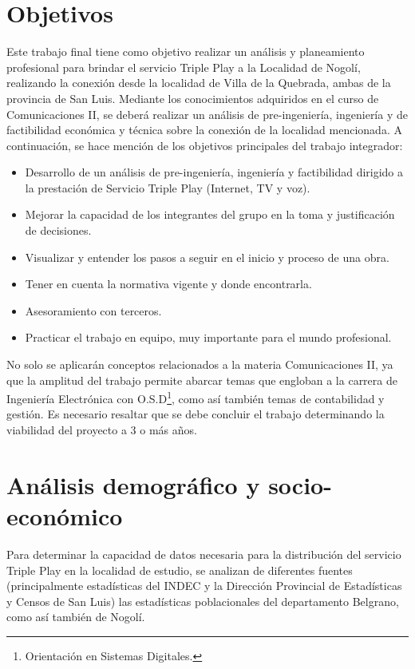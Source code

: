 \documentclass[12pt,a4paper]{book}
\begin{document}
\chapter{Objetivos}\label{objetivos}

Este trabajo final tiene como objetivo realizar un análisis y planeamiento profesional para brindar el servicio Triple Play a la Localidad de Nogolí, realizando la conexión desde la localidad de Villa de la Quebrada, ambas de la provincia de San Luis.  Mediante los conocimientos adquiridos en el curso de Comunicaciones II, se deberá realizar un análisis de pre-ingeniería, ingeniería y de factibilidad económica y técnica sobre la conexión de la localidad mencionada. A continuación, se hace mención de los objetivos principales del trabajo integrador:

\begin{itemize}
\item Desarrollo de un análisis de pre-ingeniería, ingeniería y factibilidad dirigido a la prestación de Servicio Triple Play (Internet, TV y voz).
\item Mejorar la capacidad de los integrantes del grupo en la toma y justificación de decisiones.
\item Visualizar y entender los pasos a seguir en el inicio y proceso de una obra.
\item Tener en cuenta la normativa vigente y donde encontrarla.
\item Asesoramiento con terceros.
\item Practicar el trabajo en equipo, muy importante para el mundo profesional.
\end{itemize}

No solo se aplicarán conceptos relacionados a la materia Comunicaciones II, ya que la amplitud del trabajo permite abarcar temas que engloban a la carrera de Ingeniería Electrónica con O.S.D\footnote{Orientación en Sistemas Digitales.}, como así también temas de contabilidad y gestión. Es necesario resaltar que se debe concluir el trabajo determinando la viabilidad del proyecto a 3 o más años.


\chapter{Análisis demográfico y socio-económico}\label{cap_demografico}

Para determinar la capacidad de datos necesaria para la distribución del servicio Triple Play en la localidad de estudio, se analizan de diferentes fuentes (principalmente estadísticas del INDEC y la Dirección Provincial de Estadísticas y Censos de San Luis) las estadísticas poblacionales del departamento Belgrano, como así también de Nogolí. 
\end{document}
